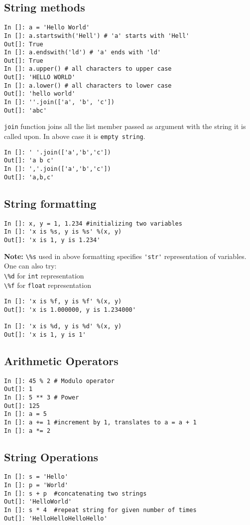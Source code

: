 \documentclass[12pt]{article}
\newcommand{\typ}[1]{\lstinline{#1}}
\begin{document}
\subsection{String methods}
  \begin{lstlisting}
In []: a = 'Hello World' 
In []: a.startswith('Hell') # 'a' starts with 'Hell'
Out[]: True
In []: a.endswith('ld') # 'a' ends with 'ld'
Out[]: True
In []: a.upper() # all characters to upper case
Out[]: 'HELLO WORLD'
In []: a.lower() # all characters to lower case
Out[]: 'hello world'
In []: ''.join(['a', 'b', 'c'])
Out[]: 'abc'
  \end{lstlisting}
\typ{join} function joins all the list member passed as argument with the string it is called upon. In above case it is \typ{empty string}.
\begin{lstlisting}
In []: ' '.join(['a','b','c'])
Out[]: 'a b c'  
In []: ','.join(['a','b','c'])
Out[]: 'a,b,c'
\end{lstlisting}
\subsection{String formatting}
  \begin{lstlisting}
In []: x, y = 1, 1.234 #initializing two variables
In []: 'x is %s, y is %s' %(x, y)
Out[]: 'x is 1, y is 1.234'
  \end{lstlisting}
\textbf{Note:} \typ{\%s} used in above formatting specifies \typ{'str'} representation of variables. One can also try:\\
\typ{\%d} for \typ{int} representation\\
\typ{\%f} for \typ{float} representation
\begin{lstlisting}
In []: 'x is %f, y is %f' %(x, y)
Out[]: 'x is 1.000000, y is 1.234000'

In []: 'x is %d, y is %d' %(x, y)
Out[]: 'x is 1, y is 1'
\end{lstlisting}
\subsection{Arithmetic Operators}
  \begin{lstlisting}
In []: 45 % 2 # Modulo operator
Out[]: 1
In []: 5 ** 3 # Power
Out[]: 125
In []: a = 5
In []: a += 1 #increment by 1, translates to a = a + 1
In []: a *= 2
  \end{lstlisting}
\subsection{String Operations}
\begin{lstlisting}
In []: s = 'Hello'
In []: p = 'World'
In []: s + p  #concatenating two strings
Out[]: 'HelloWorld'
In []: s * 4  #repeat string for given number of times
Out[]: 'HelloHelloHelloHello'
\end{lstlisting}
\end{document}
